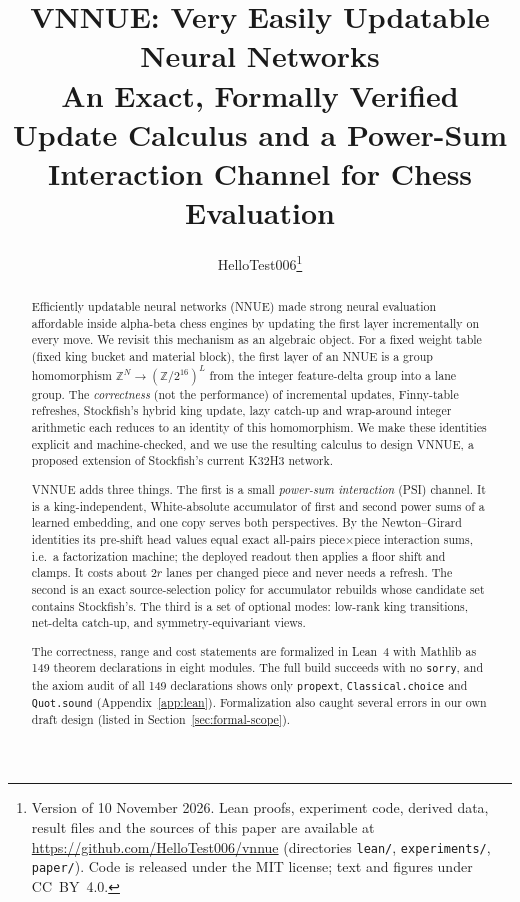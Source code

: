 \documentclass[10pt]{article}
\title{VNNUE: Very Easily Updatable Neural Networks\\[4pt]
\large An Exact, Formally Verified Update Calculus and a Power-Sum Interaction Channel for Chess Evaluation}
\author{HelloTest006\thanks{Version of 10 November 2026. Lean proofs, experiment code, derived data, result files and the sources of this paper are available at \url{https://github.com/HelloTest006/vnnue} (directories \texttt{lean/}, \texttt{experiments/}, \texttt{paper/}). Code is released under the MIT license; text and figures under CC~BY~4.0.}}
\date{}
\newcommand{\Z}{\mathbb{Z}}
\newcommand{\Zm}[1]{\Z/2^{#1}}
\theoremstyle{plain}
\theoremstyle{definition}
\begin{document}
\maketitle

\begin{abstract}
Efficiently updatable neural networks (NNUE) made strong neural evaluation affordable inside alpha-beta chess engines by updating the first layer incrementally on every move.
We revisit this mechanism as an algebraic object.
For a fixed weight table (fixed king bucket and material block), the first layer of an NNUE is a group homomorphism $\Z^N\to(\Zm{16})^L$ from the integer feature-delta group into a lane group.
The \emph{correctness} (not the performance) of incremental updates, Finny-table refreshes, Stockfish's hybrid king update, lazy catch-up and wrap-around integer arithmetic each reduces to an identity of this homomorphism.
We make these identities explicit and machine-checked, and we use the resulting calculus to design VNNUE, a proposed extension of Stockfish's current K32H3 network.

VNNUE adds three things.
The first is a small \emph{power-sum interaction} (PSI) channel.
It is a king-independent, White-absolute accumulator of first and second power sums of a learned embedding, and one copy serves both perspectives.
By the Newton--Girard identities its pre-shift head values equal exact all-pairs piece$\times$piece interaction sums, i.e.\ a factorization machine; the deployed readout then applies a floor shift and clamps.
It costs about $2r$ lanes per changed piece and never needs a refresh.
The second is an exact source-selection policy for accumulator rebuilds whose candidate set contains Stockfish's.
The third is a set of optional modes: low-rank king transitions, net-delta catch-up, and symmetry-equivariant views.

The correctness, range and cost statements are formalized in Lean~4 with Mathlib as 149 theorem declarations in eight modules.
The full build succeeds with no \texttt{sorry}, and the axiom audit of all 149 declarations shows only \texttt{propext}, \texttt{Classical.choice} and \texttt{Quot.sound} (Appendix~\ref{app:lean}).
Formalization also caught several errors in our own draft design (listed in Section~\ref{sec:formal-scope}).


\end{abstract}
\end{document}
